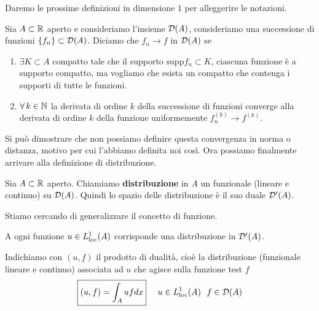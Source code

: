 Daremo le prossime definizioni in dimensione $1$ per alleggerire le notazioni.
\begin{defn}
[Convergenza in $\Dc$]Sia $A\subset \mathbb{R}$ aperto e consideriamo l'insieme $\mathcal{D}(A)$, consideriamo una successione di funzioni $\{f_{n}\} \subset \mathcal{D}(A)$. Diciamo che $f_{n}\rightarrow f$ in $\mathcal{D}(A)$ se
\begin{enumerate}
\item $\exists K\subset A$ compatto tale che il supporto $\mathrm{supp} f_{n} \subset K$, ciascuna funzione è a supporto compatto, ma vogliamo che esista un compatto che contenga i supporti di tutte le funzioni.
\item $\forall k\in \NN$ la derivata di ordine $k$ della successione di funzioni converge alla derivata di ordine $k$ della funzione uniformemente $f^{(k)}_{n}\rightarrow f^{(k)}$.
\end{enumerate}
\end{defn}
Si può dimostrare che non possiamo definire questa convergenza in norma o distanza, motivo per cui l'abbiamo definita noi così. Ora possiamo finalmente arrivare alla definizione di distribuzione.
\begin{defn}
[Distribuzione]
Sia $A\subset \mathbb{R}$ aperto. Chiamiamo \textbf{distribuzione} in $A$ un funzionale (lineare e continuo) su $\mathcal{D}(A)$. Quindi lo spazio delle distribuzione è il suo duale $\mathcal{D}'(A)$.
\end{defn}
Stiamo cercando di generalizzare il concetto di funzione.
\begin{thm}
A ogni funzione $u\in L^{1}_{\operatorname{loc}}(A)$ corrisponde una distribuzione in $\mathcal{D}'(A)$.

Indichiamo con $(u, f)$ il prodotto di dualità, cioè la distribuzione (funzionale lineare e continuo) associata ad $u$ che agisce sulla funzione test $f$
\begin{equation*}
\boxed{(u, f) = \int_{A} ufdx} \ \ \ \ u\in L^{1}_{\operatorname{loc}}(A) \ \ f\in \mathcal{D}(A)
\end{equation*}
\end{thm}
